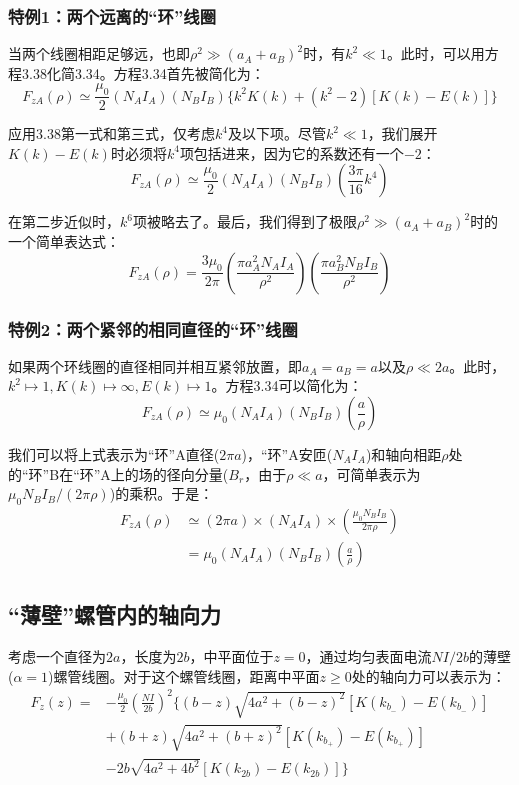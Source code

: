 \subsubsection{特例1：两个远离的“环”线圈}
当两个线圈相距足够远，也即$\rho^2 \gg (a_A+a_B)^2$时，有$k^2\ll 1$。此时，可以用方程3.38化简3.34。方程3.34首先被简化为：
\begin{equation}
  F_{zA}(\rho)\simeq \frac{\mu_0}{2}(N_A I_A)(N_B I_B)\{ k^2K(k)+(k^2-2)[K(k)-E(k)]\}
\end{equation}

应用3.38第一式和第三式，仅考虑$k^4$及以下项。尽管$k^2\ll 1$，我们展开$K(k)-E(k)$时必须将$k^4$项包括进来，因为它的系数还有一个$-2$：
\begin{equation*}
F_{zA}(\rho)\simeq \frac{\mu_0}{2}(N_A I_A)(N_B I_B)(\frac{3\pi}{16}k^4) \tag{3.39'}
\end{equation*}

在第二步近似时，$k^6$项被略去了。最后，我们得到了极限$\rho^2 \gg (a_A+a_B)^2$时的一个简单表达式：
\begin{equation*}
F_{zA}(\rho)= \frac{3\mu_0}{2\pi}(\frac{\pi a_A^2 N_A I_A}{\rho^2})(\frac{\pi a_B^2 N_B I_B}{\rho^2}) \tag{3.39''}
\end{equation*}

\subsubsection{特例2：两个紧邻的相同直径的“环”线圈}
如果两个环线圈的直径相同并相互紧邻放置，即$a_A=a_B=a$以及$\rho\ll 2a$。此时，$k^2\mapsto 1,K(k)\mapsto\infty,E(k)\mapsto 1$。方程3.34可以简化为：
\begin{equation*}
F_{zA}(\rho)\simeq \mu_0(N_A I_A)(N_B I_B)(\frac{a}{\rho}) \tag{3.39'''}
\end{equation*}

我们可以将上式表示为“环”A直径($2\pi a$)，“环”A安匝($N_A I_A$)和轴向相距$\rho$处的“环”B在“环”A上的场的径向分量($B_r$，由于$\rho\ll a$，可简单表示为$\mu_0 N_B I_B/(2\pi\rho)$)的乘积。于是：
\begin{equation*}
\begin{split}
F_{zA}(\rho)&\simeq (2\pi a)\times(N_A I_A)\times(\frac{\mu_0 N_B I_B}{2\pi\rho})\\
&=\mu_0(N_A I_A)(N_B I_B)(\frac{a}{\rho}) 
\end{split}\tag{3.39'''}
\end{equation*}


\subsection{“薄壁”螺管内的轴向力}
考虑一个直径为$2a$，长度为$2b$，中平面位于$z=0$，通过均匀表面电流$NI/2b$的薄壁($\alpha=1$)螺管线圈。对于这个螺管线圈，距离中平面$z\ge 0$处的轴向力可以表示为：
\begin{equation}
\begin{split}
F_z(z)=&-\frac{\mu_0}{2}(\frac{NI}{2b})^2\{(b-z)\sqrt{4a^2+(b-z)^2}[K(k_{b_-})-E(k_{b_-})]\\
&+(b+z)\sqrt{4a^2+(b+z)^2}[K(k_{b_+})-E(k_{b_+})]\\
&-2b\sqrt{4a^2+4b^2}[K(k_{2b})-E(k_{2b})]\}
\end{split}
\end{equation}

